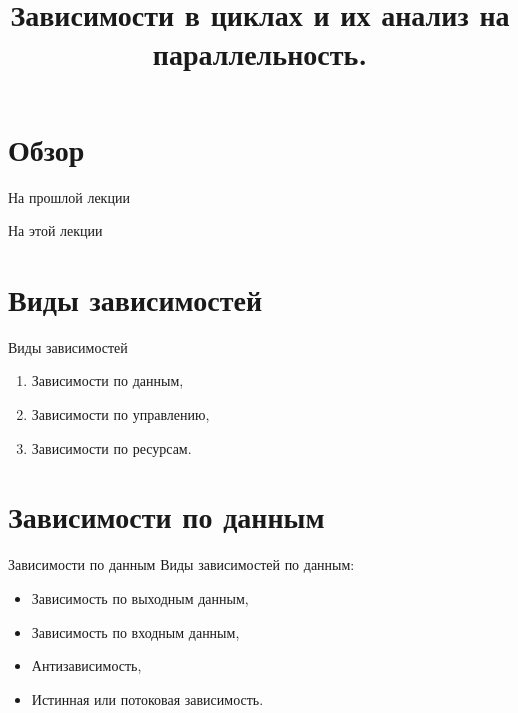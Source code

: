 

\title{Зависимости в циклах и их анализ на параллельность.}



\begin{frame}
\titlepage
\end{frame}

\section*{Обзор}

\begin{frame}{На прошлой лекции}
\end{frame}

\begin{frame}{На этой лекции}
\tableofcontents
\end{frame}

\section{Виды зависимостей}

\begin{frame}{Виды зависимостей}
\begin{enumerate}
    \item Зависимости по данным,
    \pause
    \item Зависимости по управлению,
    \pause
    \item Зависимости по ресурсам.
\end{enumerate}
\end{frame}

\section{Зависимости по данным}

\begin{frame}{Зависимости по данным}
Виды зависимостей по данным:

\begin{itemize}
    \item Зависимость по выходным данным,
    \item Зависимость по входным данным,
    \item Антизависимость,
    \item Истинная или потоковая зависимость.
\end{itemize}
\end{frame}

